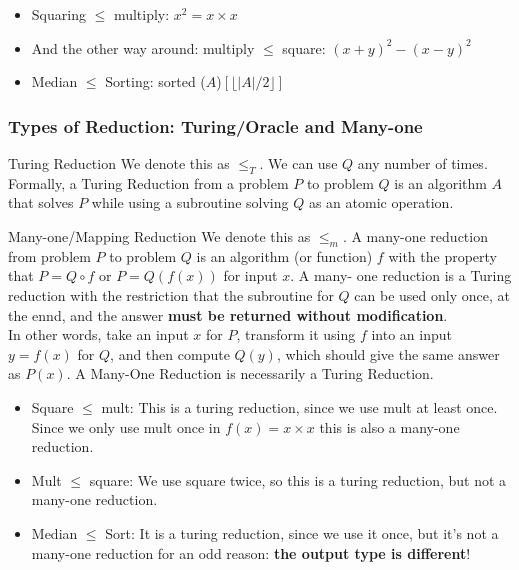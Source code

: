 \documentclass[11pt]{article}
\begin{document}
\begin{itemize}
    \item Squaring $\leq$ multiply: $x^2 = x \times x$
    \item And the other way around: multiply $\leq$ square: $(x+y)^2-(x-y)^2$
    \item Median $\leq$ Sorting: sorted ($A$)$[\lfloor|A| / 2\rfloor]$
\end{itemize}

\subsubsection{Types of Reduction: Turing/Oracle and Many-one}

\begin{definitionbox}{Turing Reduction}
    We denote this as $\leq_T$. We can use $Q$ any number of times. Formally, a Turing Reduction from
    a problem $P$ to problem $Q$ is an algorithm $A$ that solves $P$ while using a subroutine solving
    $Q$ as an atomic operation.
\end{definitionbox}

\begin{definitionbox}{Many-one/Mapping Reduction}
    We denote this as $\leq_m$. A many-one reduction from problem $P$ to problem $Q$ is an algorithm 
    (or function) $f$ with the property that $P = Q \circ f$ or $P = Q(f(x))$ for input $x$. A many-
    one reduction is a Turing reduction with the restriction that the subroutine for $Q$ can be used
    only once, at the ennd, and the answer \textbf{must be returned without modification}. \\
    In other words, take an input $x$ for $P$, transform it using $f$ into an input $y=f(x)$ for $Q$,
    and then compute $Q(y)$, which should give the same answer as $P(x)$. A Many-One Reduction is
    necessarily a Turing Reduction.
\end{definitionbox}

\begin{itemize}
    \item Square $\leq$ mult: This is a turing reduction, since we use mult at least once. Since we
        only use mult once in $f(x)=x \times x$ this is also a many-one reduction.
    \item Mult $\leq$ square: We use square twice, so this is a turing reduction, but not a many-one
        reduction.
    \item Median $\leq$ Sort: It is a turing reduction, since we use it once, but it's not a many-one
        reduction for an odd reason: \textbf{the output type is different}!
\end{itemize}
\end{document}

